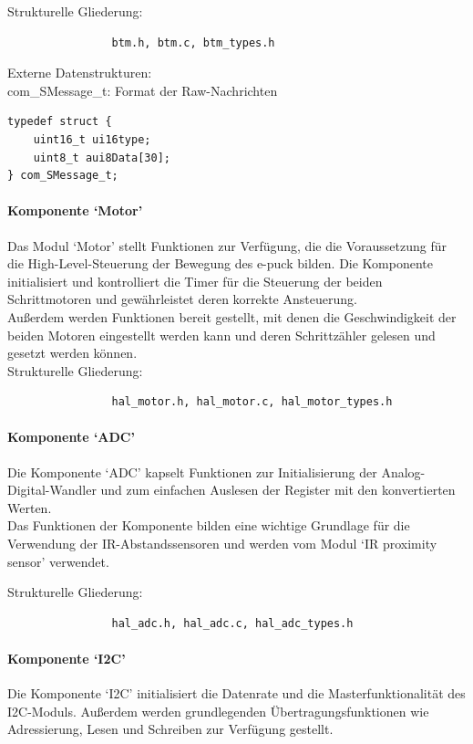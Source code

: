\documentclass[10pt,a4paper]{article}
\begin{document}
				Strukturelle Gliederung:
				\begin{verbatim}  
				btm.h, btm.c, btm_types.h
				\end{verbatim}
				
				Externe Datenstrukturen: \\
				com\_SMessage\_t: Format der Raw-Nachrichten
				
				\lstset{language = C, tabsize = 4}
				\begin{lstlisting}[frame = single]
typedef struct {
	uint16_t ui16type;
	uint8_t aui8Data[30];
} com_SMessage_t;
				\end{lstlisting}
				
			\paragraph*{Komponente `Motor'}
			Das Modul `Motor' stellt Funktionen zur Verfügung, die die Voraussetzung für die High-Level-Steuerung der Bewegung des e-puck bilden.
			Die Komponente initialisiert und kontrolliert die Timer für die Steuerung der beiden Schrittmotoren und gewährleistet deren korrekte
			Ansteuerung. \\
			Außerdem werden Funktionen bereit gestellt, mit denen die Geschwindigkeit der beiden Motoren eingestellt werden kann und deren
			Schrittzähler gelesen und gesetzt werden können. \\
			
			Strukturelle Gliederung:
				\begin{verbatim}  
				hal_motor.h, hal_motor.c, hal_motor_types.h
				\end{verbatim}
						
			\paragraph*{Komponente `ADC'}
			Die Komponente `ADC' kapselt Funktionen zur Initialisierung der Analog-Digital-Wandler und zum einfachen Auslesen der Register
			mit den konvertierten Werten. \\
			Das Funktionen der Komponente bilden eine wichtige Grundlage für die Verwendung der IR-Abstandssensoren und werden vom Modul `IR 
			proximity sensor' verwendet.
			
			Strukturelle Gliederung:
				\begin{verbatim}  
				hal_adc.h, hal_adc.c, hal_adc_types.h
				\end{verbatim}
			
			\paragraph*{Komponente `I2C'}
			Die Komponente `I2C' initialisiert die Datenrate und die Masterfunktionalität des I2C-Moduls.
			Außerdem werden grundlegenden Übertragungsfunktionen wie Adressierung, Lesen und Schreiben zur Verfügung gestellt. \\
			
\end{document}
